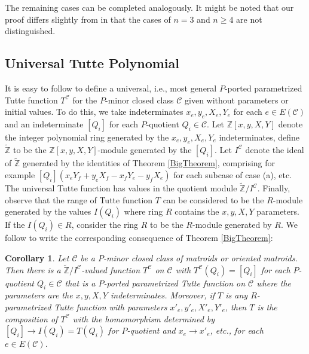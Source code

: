 \documentclass[12pt,leqno]{amsart}
\newtheorem{cor}[lem]{Corollary}
\theoremstyle{remark}
\begin{document}
The remaining cases can be completed analogously.  It might be
noted that our proof differs slightly from \cite{Ellis-Monaghan-Traldi}
in that the cases of $n=3$ and $n\ge 4$ are not distinguished.

\subsection{Universal Tutte Polynomial}
\label{UniversalSec}
It is easy to follow 
\cite{BollobasRiordanTuttePolyColored,Ellis-Monaghan-Traldi} to define
a universal, i.e., most general $P$-ported parametrized
Tutte function $T^{\mathcal{C}}$ for the $P$-minor closed class 
$\mathcal{C}$ given without parameters or initial values.  To do this,
we take indeterminates $x_e, y_e, X_e, Y_e$ for each $e\in E(\mathcal{C})$
and an indeterminate $[Q_i]$ for each $P$-quotient $Q_i\in\mathcal{C}$.
Let $\mathbb{Z}[x,y,X,Y]$ denote the integer polynomial ring generated by
the $x_e,y_e,X_e,Y_e$ indeterminates, define $\widetilde{\mathbb{Z}}$
to be the $\mathbb{Z}[x,y,X,Y]$-module generated by the $[Q_i]$.  
Let $I^{\mathcal{C}}$ denote the ideal of $\widetilde{\mathbb{Z}}$ 
generated by the identities of Theorem \ref{BigTheorem}, comprising 
for example $[Q_i](x_eY_f+y_eX_f-x_fY_e-y_fX_e)$ for each subcase of
case (a), etc.  The universal Tutte function has values in the
quotient module $\widetilde{\mathbb{Z}}/I^{\mathcal{C}}$.  Finally,
observe that the range of Tutte function $T$  can be considered to be the
$R$-module generated by the values $I(Q_i)$ where ring $R$ contains the
$x,y,X,Y$ parameters. If the $I(Q_i)\in R$, consider
the ring $R$ to be the $R$-module generated by $R$.
We follow \cite{Ellis-Monaghan-Traldi} to write
the corresponding consequence of Theorem \ref{BigTheorem}:

\begin{cor}
\label{UniversalCor}
Let $\mathcal{C}$ be a $P$-minor closed class of matroids or 
oriented matroids.  Then there is a 
$\widetilde{\mathbb{Z}}/I^{\mathcal{C}}$-valued function 
$T^{\mathcal{C}}$ on $\mathcal{C}$ with $T^{\mathcal{C}}(Q_i)=[Q_i]$ for each $P$-quotient
$Q_i\in\mathcal{C}$ that is a $P$-ported parametrized Tutte function
on $\mathcal{C}$ where the parameters are the 
$x, y, X, Y$ indeterminates.  Moreover, if $T$ is any $R$-parametrized
Tutte function with parameters $x'_e, y'_e, X'_e, Y'_e$, then $T$ is the
composition of $T^{\mathcal{C}}$ with the homomorphism determined by
$[Q_i]\rightarrow I(Q_i)=T(Q_i)$ for $P$-quotient and 
$x_e\rightarrow x'_e$, etc., for each $e\in E(\mathcal{C})$.
\end{cor}
\end{document}
